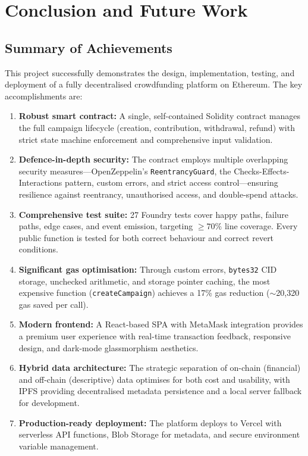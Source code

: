 \section{Conclusion and Future Work}
\label{sec:conclusion}

\subsection{Summary of Achievements}

This project successfully demonstrates the design, implementation, testing, and deployment of a fully decentralised crowdfunding platform on Ethereum. The key accomplishments are:

\begin{enumerate}[leftmargin=1.5em]
    \item \textbf{Robust smart contract:} A single, self-contained Solidity contract manages the full campaign lifecycle (creation, contribution, withdrawal, refund) with strict state machine enforcement and comprehensive input validation.
    
    \item \textbf{Defence-in-depth security:} The contract employs multiple overlapping security measures---OpenZeppelin's \texttt{ReentrancyGuard}, the Checks-Effects-Interactions pattern, custom errors, and strict access control---ensuring resilience against reentrancy, unauthorised access, and double-spend attacks.
    
    \item \textbf{Comprehensive test suite:} 27 Foundry tests cover happy paths, failure paths, edge cases, and event emission, targeting $\geq 70\%$ line coverage. Every public function is tested for both correct behaviour and correct revert conditions.
    
    \item \textbf{Significant gas optimisation:} Through custom errors, \texttt{bytes32} CID storage, unchecked arithmetic, and storage pointer caching, the most expensive function (\texttt{createCampaign}) achieves a 17\% gas reduction ($\sim$20,320 gas saved per call).
    
    \item \textbf{Modern frontend:} A React-based SPA with MetaMask integration provides a premium user experience with real-time transaction feedback, responsive design, and dark-mode glassmorphism aesthetics.
    
    \item \textbf{Hybrid data architecture:} The strategic separation of on-chain (financial) and off-chain (descriptive) data optimises for both cost and usability, with IPFS providing decentralised metadata persistence and a local server fallback for development.
    
    \item \textbf{Production-ready deployment:} The platform deploys to Vercel with serverless API functions, Blob Storage for metadata, and secure environment variable management.
\end{enumerate}

